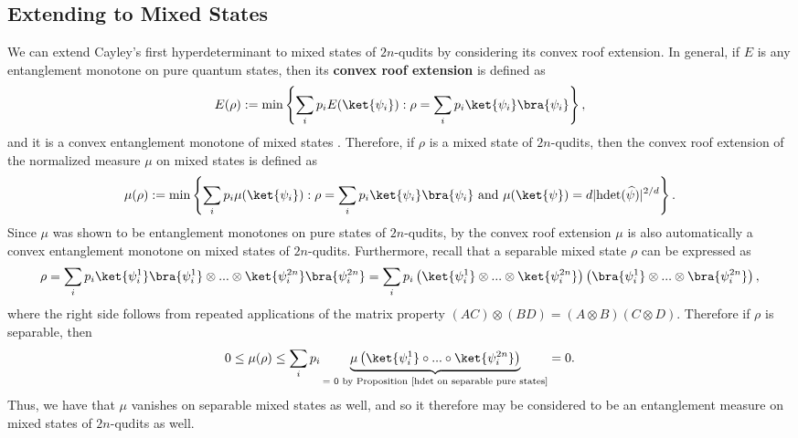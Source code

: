 \documentclass{article}
\begin{document}
\subsection{Extending to Mixed States}
We can extend Cayley's first hyperdeterminant to mixed states of $2n$-qudits by considering its convex roof extension. In general, if $E$ is any entanglement monotone on pure quantum states, then its \textbf{convex roof extension} is defined as 
\[E(\rho) := \min\left\{\sum\limits_ip_iE(\ket{\psi_i}):\rho = \sum\limits_ip_i\ket{\psi_i}\bra{\psi_i}\right\},\]
and it is a convex entanglement monotone of mixed states \cite{eltschka2014quantifying}. Therefore, if $\rho$ is a mixed state of $2n$-qudits, then the convex roof extension of the normalized measure $\mu$ on mixed states is defined as 
\[\mu(\rho) := \min\left\{\sum\limits_ip_i\mu(\ket{\psi_i}):\rho = \sum\limits_ip_i\ket{\psi_i}\bra{\psi_i}\text{ and }\mu(\ket{\psi}) = d|\mathrm{hdet}(\widehat{\psi})|^{2/d}\right\}.\]
Since $\mu$ was shown to be entanglement monotones on pure states of $2n$-qudits, by the convex roof extension $\mu$ is also automatically a convex entanglement monotone on mixed states of $2n$-qudits. Furthermore, recall that a separable mixed state $\rho$ can be expressed as 
\[\rho = \sum\limits_ip_i\ket{\psi_i^1}\bra{\psi_i^1}\otimes...\otimes\ket{\psi_i^{2n}}\bra{\psi_i^{2n}} = \sum\limits_ip_i\left(\ket{\psi_i^1}\otimes...\otimes \ket{\psi_i^{2n}}\right)\left(\bra{\psi_i^1}\otimes...\otimes\bra{\psi_i^{2n}}\right),\]
where the right side follows from repeated applications of the matrix property $(AC)\otimes (BD) = (A\otimes B)(C\otimes D)$. Therefore if $\rho$ is separable, then 
\[0 \leq \mu(\rho) \leq \sum\limits_ip_i\underbrace{\mu\left(\ket{\psi_i^1}\circ...\circ \ket{\psi_i^{2n}}\right)}_{=\text{ }0\text{ by Proposition \ref{hdet on separable pure states}}} = 0.\]
Thus, we have that $\mu$ vanishes on separable mixed states as well, and so it therefore may be considered to be an entanglement measure on mixed states of $2n$-qudits as well. 
\end{document}
